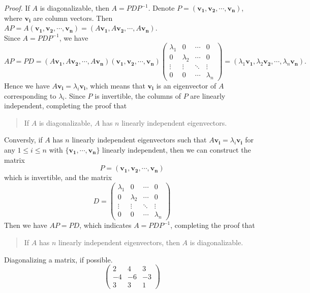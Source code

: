 \documentclass[10pt, a4paper]{article}
\newcommand{\vt}[1]{\mathbf{#1}}
\begin{document}
    \indent \textit{Proof.} If $A$ is diagonalizable, then $A=PDP^{-1}$. Denote $P=(\vt{v_1},\vt{v_2},\cdots,\vt{v_n})$, where $\vt{v_i}$ are column vectors. Then $AP=A(\vt{v_1},\vt{v_2},\cdots,\vt{v_n})=(A\vt{v_1},A\vt{v_2},\cdots,A\vt{v_n})$.\\
    Since $A=PDP^{-1}$, we have \[
    AP=PD=(A\vt{v_1},A\vt{v_2},\cdots,A\vt{v_n})
    (\vt{v_1},\vt{v_2},\cdots,\vt{v_n})\begin{pmatrix}
        \lambda_1&0&\cdots&0\\
        0&\lambda_2&\cdots&0\\
        \vdots&\vdots&\ddots&\vdots\\
        0&0&\cdots&\lambda_n
    \end{pmatrix}= (\lambda_1\vt{v_1},\lambda_2\vt{v_2},\cdots,\lambda_n\vt{v_n}).
    \]
    Hence we have $A\vt{v_i}=\lambda_i\vt{v_i}$, which means that $\vt{v_i}$ is an eigenvector of $A$ corresponding to $\lambda_i$. Since $P$ is invertible, the columns of $P$ are linearly independent, completing the proof that 
\begin{quotation}
    If $A$ is diagonalizable, $A$ has $n$ linearly independent eigenvectors.
\end{quotation}
\indent \indent Conversly, if $A$ has $n$ linearly independent eigenvectors such that $A\vt{v_i}=\lambda_i\vt{v_i}$ for any $1\leq i\leq n$ with $\{\vt{v_1},\cdots,\vt{v_n}\}$ linearly independent, then we can construct the matrix $$P=(\vt{v_1},\vt{v_2},\cdots,\vt{v_n})$$ which is invertible, and the matrix 
\[
D=\begin{pmatrix}
    \lambda_1&0&\cdots&0\\
    0&\lambda_2&\cdots&0\\
    \vdots&\vdots&\ddots&\vdots\\
    0&0&\cdots&\lambda_n
\end{pmatrix}
\]
Then we have $AP=PD$, which indicates $A=PDP^{-1}$, completing the proof that 
\begin{quotation}
    If $A$ has $n$ linearly independent eigenvectors, then $A$ is diagonalizable.
\end{quotation}
\begin{example}
    Diagonalizing a matrix, if possible.
    \[
    \begin{pmatrix}
        2&4&3\\
        -4&-6&-3\\
        3&3&1
    \end{pmatrix}
    \]
\end{example}
\end{document}
